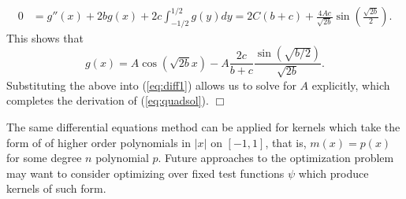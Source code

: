 	\begin{align}
		0 
			&= g'' (x) + 2b g(x) + 2c \int_{-1/2}^{1/2} g(y) dy = 2C (b + c) + \frac{4A c}{\sqrt{2b}} \sin\left( \frac{\sqrt{2b}}{2} \right).
	\end{align}
	This shows that
	\begin{equation}
		 g(x) = A\cos(\sqrt{2b} x) - A\frac{2c}{b + c} \frac{\sin\left( \sqrt{b/2} \right)}{\sqrt{2b}}. 
	\end{equation} 
	Substituting the above into (\ref{eq:diff1}) allows us to solve for $A$ explicitly, which completes the derivation of (\ref{eq:quadsol}). \hfill $\Box$

\begin{remark}
    The same differential equations method can be applied for kernels which take the form of of higher order polynomials in $|x|$ on $[-1, 1]$, that is, $m(x) = p(x)$ for some degree $n$ polynomial $p$. Future approaches to the optimization problem may want to consider optimizing over fixed test functions $\psi$ which produce kernels of such form. 
\end{remark}
